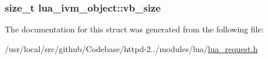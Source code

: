 \subsubsection[{\texorpdfstring{vb\+\_\+size}{vb_size}}]{\setlength{\rightskip}{0pt plus 5cm}size\+\_\+t lua\+\_\+ivm\+\_\+object\+::vb\+\_\+size}\hypertarget{structlua__ivm__object_aa095decb8709e04338ab36f1348320c6}{}\label{structlua__ivm__object_aa095decb8709e04338ab36f1348320c6}


The documentation for this struct was generated from the following file\+:\begin{DoxyCompactItemize}
\item 
/usr/local/src/github/\+Codebase/httpd-\/2../modules/lua/\hyperlink{lua__request_8h}{lua\+\_\+request.\+h}\end{DoxyCompactItemize}
